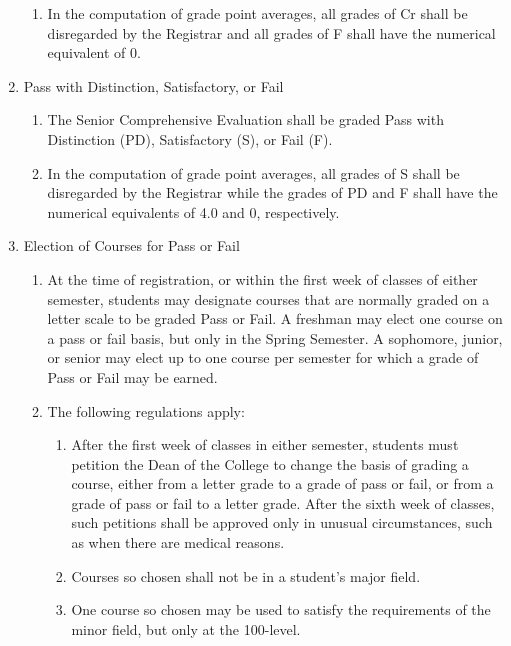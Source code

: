 \documentclass{manual}
\newcommand{\itemLevelA}{\alph*.}
\newcommand{\itemLevelB}{\arabic*)}
\newcommand{\itemLevelC}{\alph*)}
\newcommand{\itemRefA}{\alph*}
\newcommand{\itemRefB}{\arabic*}
\newcommand{\itemRefC}{\alph*}
\begin{document}
\begin{enumerate}[label=\itemLevelA,ref=\itemRefA]
\begin{enumerate}[label=\itemLevelB,ref=\itemRefB]
\item In the computation of grade point averages, all grades of Cr shall be disregarded by the Registrar and all grades of F shall have the numerical equivalent of 0. 
\end{enumerate}

\item Pass with Distinction, Satisfactory, or Fail
\begin{enumerate}[label=\itemLevelB,ref=\itemRefB]
\item The Senior Comprehensive Evaluation shall be graded Pass with Distinction (PD), Satisfactory (S), or Fail (F). 

\item In the computation of grade point averages, all grades of S shall be disregarded by the Registrar while the grades of PD and F shall have the numerical equivalents of 4.0 and 0, respectively.
\end{enumerate}

\item Election of Courses for Pass or Fail
\begin{enumerate}[label=\itemLevelB,ref=\itemRefB]

\item At the time of registration, or within the first week of classes of either semester, students may designate courses that are normally graded on a letter scale to be graded Pass or Fail. A freshman may elect one course on a pass or fail basis, but only in the Spring Semester. A sophomore, junior, or senior may elect up to one course per semester for which a grade of Pass or Fail may be earned. 

\item The following regulations apply:
\begin{enumerate}[label=\itemLevelC,ref=\itemRefC]
\item After the first week of classes in either semester, students must petition the Dean of the College to change the basis of grading a course, either from a letter grade to a grade of pass or fail, or from a grade of pass or fail to a letter grade. After the sixth week of classes, such petitions shall be approved only in unusual circumstances, such as when there are medical reasons. 

\item Courses so chosen shall not be in a student's major field. 

\item One course so chosen may be used to satisfy the requirements of the minor field, but only at the 100-level. 


\end{enumerate}
\end{enumerate}
\end{enumerate}
\end{document}
